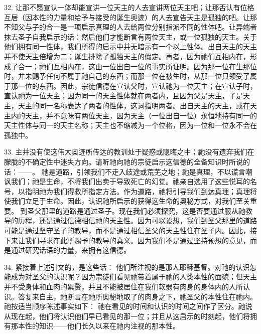 32. 让那不愿宣认一体却能宣讲一位天主的人去宣讲两位天主吧；让那否认有位格互居（因本性的力量和给予与接受的诞生奥迹）的人去宣告天主是孤独的吧。让那不知父与子的合一是一项启示真理的人去给两位分别指派不同的性体吧。让异端者抹去圣子自我启示的话：然后他们才能断言有两位天主，或一位孤独的天主。关于他们拥有同一性体，我们所得的启示中并无暗示有一个以上性体。出自天主的天主并不使天主倍增为二；诞生排除了孤独天主的假定。再者，因为祂们互相内在，形成了合一；祂们互相内在，这由一位出自一位的事实所证明。因为那一位在生那位时，并未赐予任何不属于祂自己的东西；而那一位在被生时，从那一位只领受了属于那一位的东西。因此，宗徒信德在宣认父时，宣认祂为一位天主；在宣认子时，宣认祂为一位天主；因为同一的天主性体就在两者内，且因为父是天主，子是天主，天主的同一名称表达了两者的性体，这词指明两者。出自天主的天主，或在天主内的天主，并不意味有两位天主，因为天主（一位出自一位）永恒地持有同一的天主性体与同一的天主名称；天主也不缩减为一个位格，因为一位和一位永不会在孤独中。\par

33. 主并没有使这伟大奥迹所传达的教训处于疑惑或隐晦之中；祂没有遗弃我们在朦胧的不确定性中迷失方向。请听祂向祂的宗徒启示这信德的全备知识时所说的话：——。 祂是道路，引领我们不走入歧途或荒芜之地；祂是真理，不以谎言嘲讽我们；祂是生命，不将我们出卖于导致死亡的幻觉。祂亲自选用了这些悦耳的名号，以指明祂为我们得救所指定方法。作为道路，祂将引导我们到达真理；真理将使我们立足于生命。因此，认识祂所启示的获得这生命的奥秘方式，对我们至关重要。 到圣父那里的道路是通过圣子。现在我们必须探究，这是否要通过服从祂教导的历程，还是通过信德相信祂的天主性。因为可以设想，我们到圣父那里的道路可能是通过坚守圣子的教导，而不是通过相信圣父的天主性住在圣子内。因此，接下来让我们寻求在此所赐予的教导的真义。因为我们不是通过坚持预想的意见，而是通过研究话语的力量，来拥有这信德。\par

34. 紧接着上述引文的，是这些话： 他们所注视的是那人耶稣基督。对祂的认识怎能成为对圣父的认识呢？因为宗徒们看见祂带着属于祂的人类本性的面貌；但天主并不受身体和血肉的累赘，并且不能被居住在我们软弱有肉身的身体内的人所认识。答复来自主，祂断言在祂所奥秘地取了的肉身之下，祂圣父的本性住在祂内。祂按适当顺序陈述事实如下： 祂在看见的时间和认识的时间之间作了区分。祂说从现在起，他们将认识他们早已看见的那一位；并且从这启示的时刻起，他们将拥有那本性的知识——他们长久以来在祂内注视的那本性。\par

